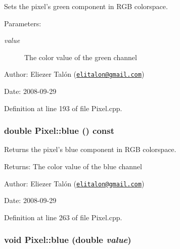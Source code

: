 Sets the pixel's green component in RGB colorspace. 

\begin{Desc}
\item[Parameters:]
\begin{description}
\item[{\em value}]The color value of the green channel\end{description}
\end{Desc}
\begin{Desc}
\item[Author:]Eliezer Talón (\href{mailto:elitalon@gmail.com}{\tt elitalon@gmail.com}) \end{Desc}
\begin{Desc}
\item[Date:]2008-09-29 \end{Desc}


Definition at line 193 of file Pixel.cpp.\hypertarget{class_pixel_978b4078a48ff2a67b55dd10eec78fb2}{
\subsubsection[blue]{\setlength{\rightskip}{0pt plus 5cm}double Pixel::blue () const}}
\label{class_pixel_978b4078a48ff2a67b55dd10eec78fb2}


Returns the pixel's blue component in RGB colorspace. 

\begin{Desc}
\item[Returns:]The color value of the blue channel\end{Desc}
\begin{Desc}
\item[Author:]Eliezer Talón (\href{mailto:elitalon@gmail.com}{\tt elitalon@gmail.com}) \end{Desc}
\begin{Desc}
\item[Date:]2008-09-29 \end{Desc}


Definition at line 263 of file Pixel.cpp.\hypertarget{class_pixel_ff3909b84c97a1c3d14a773c8825ade1}{
\subsubsection[blue]{\setlength{\rightskip}{0pt plus 5cm}void Pixel::blue (double {\em value})}}
\label{class_pixel_ff3909b84c97a1c3d14a773c8825ade1}


